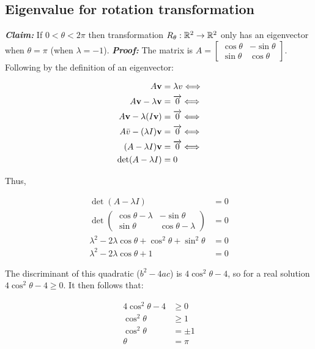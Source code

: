 \subsection{Eigenvalue for rotation transformation}

\textbf{\textit{Claim:}} 
If $0< \theta <2\pi$ then transformation $R_\theta : \mathbb{R}^2\rightarrow \mathbb{R}^2$ only has an eigenvector when $\theta=\pi$ (when $\lambda=-1$).
\newline \noindent
\textbf{\textit{Proof:}}
\noindent
The matrix is $A=\begin{bmatrix}\cos\theta & -\sin\theta\\\sin\theta & \cos\theta\end{bmatrix}$. Following by the definition of an eigenvector:

\[
    \begin{aligned}
        A \textbf{v} &=\lambda v \Longleftrightarrow \\
        A \textbf{v}-\lambda \textbf{v} &=\overrightarrow{0} \Longleftrightarrow \\
        A \textbf{v}-\lambda(I \textbf{v}) &=\overrightarrow{0} \Longleftrightarrow \\
        A \bar{v}-(\lambda I) \textbf{v} &=\overrightarrow{0} \Longleftrightarrow \\
        (A-\lambda I) \textbf{v} &=\overrightarrow{0} \Longleftrightarrow \\
            \operatorname{det}(A-\lambda I)&=0
        \end{aligned}    
\]

Thus,

\[
    \begin{aligned}
        \operatorname{det}(A-\lambda I) &=0 \\
        \operatorname{det}\left(\begin{array}{cc}
        \cos \theta-\lambda & -\sin \theta \\
        \sin \theta & \cos \theta-\lambda
        \end{array}\right) &=0 \\
        \lambda^{2}-2 \lambda \cos \theta+\cos ^{2} \theta+\sin ^{2} \theta &=0 \\
        \lambda^{2}-2 \lambda \cos \theta+1 &=0
        \end{aligned}    
\]

The discriminant of this quadratic ($b^2-4ac$) is $4\cos^2\theta-4$, so for a real solution $4\cos^2\theta-4\geq 0$. It then follows
that:

\begin{align*}
    4\cos^2\theta-4&\geq 0\\
    \cos^2\theta&\geq 1\\
    \cos^2\theta&=\pm 1\\
    \theta&=\pi
\end{align*}

